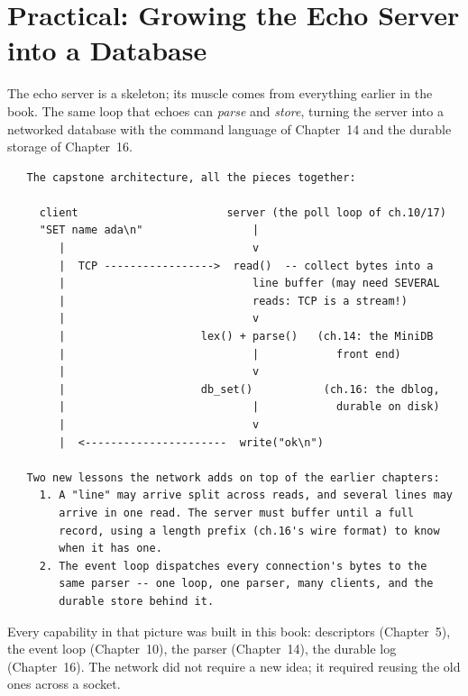 \section{Practical: Growing the Echo Server into a Database}

The echo server is a skeleton; its muscle comes from everything
earlier in the book. The same loop that echoes can \emph{parse} and
\emph{store}, turning the server into a networked database with the
command language of Chapter~14 and the durable storage of Chapter~16.

\begin{verbatim}
   The capstone architecture, all the pieces together:

     client                       server (the poll loop of ch.10/17)
     "SET name ada\n"                 |
        |                             v
        |  TCP ----------------->  read()  -- collect bytes into a
        |                             line buffer (may need SEVERAL
        |                             reads: TCP is a stream!)
        |                             v
        |                     lex() + parse()   (ch.14: the MiniDB
        |                             |            front end)
        |                             v
        |                     db_set()           (ch.16: the dblog,
        |                             |            durable on disk)
        |                             v
        |  <----------------------  write("ok\n")

   Two new lessons the network adds on top of the earlier chapters:
     1. A "line" may arrive split across reads, and several lines may
        arrive in one read. The server must buffer until a full
        record, using a length prefix (ch.16's wire format) to know
        when it has one.
     2. The event loop dispatches every connection's bytes to the
        same parser -- one loop, one parser, many clients, and the
        durable store behind it.
\end{verbatim}

Every capability in that picture was built in this book: descriptors
(Chapter~5), the event loop (Chapter~10), the parser (Chapter~14), the
durable log (Chapter~16). The network did not require a new idea; it
required reusing the old ones across a socket.

